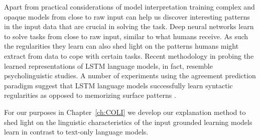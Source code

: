 Apart from practical considerations of model interpretation training complex and opaque models
from close to raw input can help us discover interesting patterns in the input data that
are crucial in solving the task.
Deep neural networks learn to solve tasks from close to raw input, similar to
what humans receive. As such the regularities they learn can also shed light on the patterns
humans might extract from data to cope with certain tasks.
Recent methodology in probing the learned representations of LSTM language models,
in fact, resemble psycholinguistic studies.
A number of experiments using the agreement prediction paradigm
\citep{bock1991broken} suggest that LSTM language models successfully learn
syntactic regularities as opposed to memorizing surface patterns
\citep{linzen2016assessing,enguehard2017exploring,bernardy2017using,gulordava2018colorless}.

For our purposes in Chapter~\ref{ch:COLI} we develop our explanation method to
shed light on the linguistic characteristics of the input grounded learning
models learn in contrast to text-only language models.







